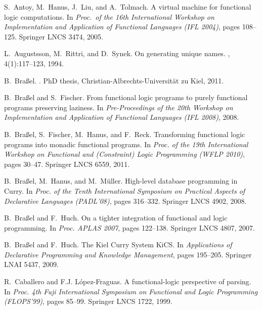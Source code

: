 \documentclass{llncs}
\begin{document}
\begin{thebibliography}{10}
S.~Antoy, M.~Hanus, J.~Liu, and A.~Tolmach.
\newblock A virtual machine for functional logic computations.
\newblock In {\em Proc.\ of the 16th International Workshop on Implementation
  and Application of Functional Languages (IFL 2004)}, pages 108--125. Springer
  LNCS 3474, 2005.

L.~Augustsson, M.~Rittri, and D.~Synek.
\newblock On generating unique names.
, 4(1):117--123, 1994.

B.~Bra{\ss}el.
.
\newblock PhD thesis, Christian-Albrechts-Universit{\"a}t zu Kiel, 2011.

B.~Bra{\ss}el and S.~Fischer.
\newblock From functional logic programs to purely functional programs
  preserving laziness.
\newblock In {\em Pre-Proceedings of the 20th Workshop on Implementation and
  Application of Functional Languages (IFL 2008)}, 2008.

B.~Bra{\ss}el, S.~Fischer, M.~Hanus, and F.~Reck.
\newblock Transforming functional logic programs into monadic functional
  programs.
\newblock In {\em Proc. of the 19th International Workshop on Functional and
  (Constraint) Logic Programming (WFLP 2010)}, pages 30--47. Springer LNCS
  6559, 2011.

B.~Bra{\ss}el, M.~Hanus, and M.~M{\"u}ller.
\newblock High-level database programming in {Curry}.
\newblock In {\em Proc. of the Tenth International Symposium on Practical
  Aspects of Declarative Languages (PADL'08)}, pages 316--332. Springer LNCS
  4902, 2008.

B.~Bra{\ss}el and F.~Huch.
\newblock On a tighter integration of functional and logic programming.
\newblock In {\em Proc. APLAS 2007}, pages 122--138. Springer LNCS 4807, 2007.

B.~Bra{\ss}el and F.~Huch.
\newblock The {Kiel} {Curry} {System} {KiCS}.
\newblock In {\em Applications of Declarative Programming and Knowledge
  Management}, pages 195--205. Springer LNAI 5437, 2009.

R.~Caballero and F.J. L{\'o}pez-Fraguas.
\newblock A functional-logic perspective of parsing.
\newblock In {\em Proc. 4th Fuji International Symposium on Functional and
  Logic Programming (FLOPS'99)}, pages 85--99. Springer LNCS 1722, 1999.


\end{thebibliography}
\end{document}
